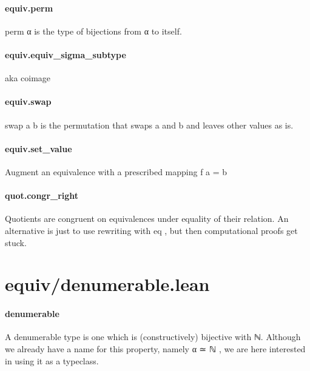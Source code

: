 \documentclass{article}
\begin{document}
\paragraph{equiv.perm}
\par
\colorbox[RGB]{253,246,227}{{{{\color[RGB]{101, 123, 131} perm α }}}} is the type of bijections from 
\colorbox[RGB]{253,246,227}{{{{\color[RGB]{101, 123, 131} α }}}} to itself.
\paragraph{equiv.equiv\_sigma\_subtype}
\par
aka coimage
\paragraph{equiv.swap}
\par
\colorbox[RGB]{253,246,227}{{{{\color[RGB]{101, 123, 131} swap a b }}}} is the permutation that swaps 
\colorbox[RGB]{253,246,227}{{{{\color[RGB]{101, 123, 131} a }}}} and 
\colorbox[RGB]{253,246,227}{{{{\color[RGB]{101, 123, 131} b }}}} and
leaves other values as is.
\paragraph{equiv.set\_value}
\par
Augment an equivalence with a prescribed mapping 
\colorbox[RGB]{253,246,227}{{{{\color[RGB]{101, 123, 131} f a  }}}{{{\color[RGB]{181, 137, 0} = }}}{{{\color[RGB]{101, 123, 131}  b }}}}\paragraph{quot.congr\_right}
\par
Quotients are congruent on equivalences under equality of their relation.
An alternative is just to use rewriting with 
\colorbox[RGB]{253,246,227}{{{{\color[RGB]{101, 123, 131} eq }}}}, but then computational proofs get stuck.
\section{equiv/denumerable.lean}\paragraph{denumerable}
\par
A denumerable type is one which is (constructively) bijective with ℕ.
Although we already have a name for this property, namely 
\colorbox[RGB]{253,246,227}{{{{\color[RGB]{101, 123, 131} α ≃ ℕ }}}},
we are here interested in using it as a typeclass.
\end{document}
